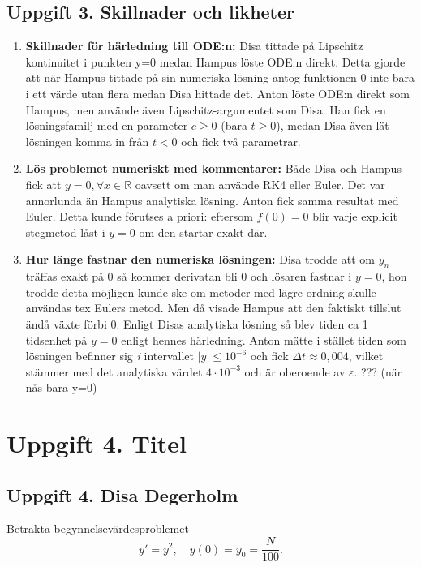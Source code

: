 \documentclass{article}
\begin{document}
\subsection*{Uppgift 3. Skillnader och likheter}

\begin{enumerate}
    \item \textbf{Skillnader för härledning till ODE:n:} Disa tittade på Lipschitz kontinuitet i punkten y=0 medan Hampus löste ODE:n direkt. Detta gjorde att när Hampus tittade på sin numeriska lösning antog funktionen 0 inte bara i ett värde utan flera medan Disa hittade det. Anton löste ODE:n direkt som Hampus, men använde även Lipschitz-argumentet
    som Disa. Han fick en lösningsfamilj med en parameter $c \geq 0$ (bara
    $t \geq 0$), medan Disa även lät lösningen komma in från $t < 0$ och fick två
    parametrar. 
    \item \textbf{Lös problemet numeriskt med kommentarer:} Både Disa och Hampus fick att $y=0, \forall x\in \mathbb{R}$ oavsett om man använde RK4 eller Euler. Det var annorlunda än Hampus analytiska lösning. Anton fick samma resultat med Euler. Detta kunde förutses a priori: eftersom
    $f(0) = 0$ blir varje explicit stegmetod låst i $y = 0$ om den startar exakt där.
    \item \textbf{Hur länge fastnar den numeriska lösningen:} Disa trodde att om $y_n$ träffas exakt på 0 så kommer derivatan bli 0 och lösaren fastnar i $y=0$, hon trodde detta möjligen kunde ske om metoder med lägre ordning skulle användas tex Eulers metod. Men då visade Hampus att den faktiskt tillslut ändå växte förbi 0. Enligt Disas analytiska lösning så blev tiden ca 1 tidsenhet på $y=0$ enligt hennes härledning. Anton mätte i stället tiden som lösningen befinner sig \emph{i} intervallet
    $|y| \leq 10^{-6}$ och fick $\Delta t \approx 0{,}004$, vilket stämmer med det
    analytiska värdet $4 \cdot 10^{-3}$ och är oberoende av $\varepsilon$. ??? (när nås bara y=0)
    \end{enumerate}

\section*{Uppgift 4. Titel}

\subsection*{Uppgift 4. Disa Degerholm}

Betrakta begynnelsevärdesproblemet
\begin{equation}
    y' = y^2, \quad y(0) = y_0 = \frac{N}{100}.
\end{equation}
\end{document}
